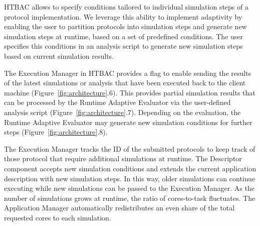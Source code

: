 HTBAC allows to specify conditions tailored to individual simulation steps of
a protocol implementation. We leverage this ability to implement adaptivity
by enabling the user to partition protocols into simulation steps and
generate new simulation steps at runtime, based on a set of predefined
conditions. The user specifies this conditions in an analysis script to
generate new simulation steps based on current simulation results.

The Execution Manager in HTBAC provides a flag to enable sending the results
of the latest simulations or analysis that have been executed back to the
client machine (Figure~\ref{fig:architecture}.6). This provides partial
simulation results that can be processed by the Runtime Adaptive Evaluator
via the user-defined analysis script (Figure~\ref{fig:architecture}.7).
Depending on the evaluation, the Runtime Adaptive Evaluator may generate new
simulation conditions for further steps (Figure~\ref{fig:architecture}.8).

The Execution Manager tracks the ID of the submitted protocols to keep track
of those protocol that require additional simulations at runtime. The
Descriptor component accepts new simulation conditions and extends the
current application description with new simulation steps. In this way, older
simulations can continue executing while new simulations can be passed to the
Execution Manager. As the number of simulations grows at runtime, the ratio
of cores-to-task fluctuates. The Application Manager automatically
redistributes an even share of the total requested cores to each simulation.





